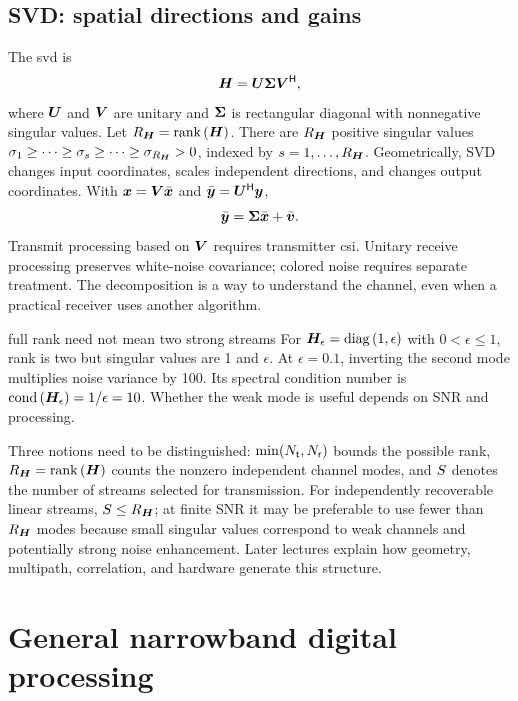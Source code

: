 \subsection{SVD: spatial directions and gains}
The \ac{svd} is
\begin{equation}\label{eq:svd}
\bm{H}=\bm{U}\bm{\Sigma}{\bm{V}}^{\mathsf{H}},
\end{equation}
where $\bm{U}$ and $\bm{V}$ are unitary and $\bm{\Sigma}$ is rectangular diagonal with nonnegative singular values. Let $R_{\bm{H}}=\operatorname{rank}\left(\bm{H}\right)$. There are $R_{\bm{H}}$ positive singular values $\sigma_1\geq\cdots\geq\sigma_s\geq\cdots\geq\sigma_{R_{\bm{H}}}>0$, indexed by $s=1,\ldots,R_{\bm{H}}$. Geometrically, SVD changes input coordinates, scales independent directions, and changes output coordinates. With $\bm{x}=\bm{V}\bar{\bm{x}}$ and $\bar{\bm{y}}={\bm{U}}^{\mathsf{H}}\bm{y}$,
\begin{equation}
\bar{\bm{y}}=\bm{\Sigma}\bar{\bm{x}}+\bar{\bm{v}}.
\end{equation}
Transmit processing based on $\bm{V}$ requires transmitter \ac{csi}. Unitary receive processing preserves white-noise covariance; colored noise requires separate treatment. The decomposition is a way to understand the channel, even when a practical receiver uses another algorithm.

\begin{example}{full rank need not mean two strong streams}
For $\bm{H}_\epsilon=\operatorname{diag}\left(1,\epsilon\right)$ with $0<\epsilon\leq1$, rank is two but singular values are 1 and $\epsilon$. At $\epsilon=0.1$, inverting the second mode multiplies noise variance by 100. Its spectral condition number is $\operatorname{cond}\left(\bm{H}_\epsilon\right)=1/\epsilon=10$. Whether the weak mode is useful depends on SNR and processing.
\end{example}
Three notions need to be distinguished: $\min(N_{\mathsf{t}},N_{\mathsf{r}})$ bounds the possible rank, $R_{\bm{H}}=\operatorname{rank}\left(\bm{H}\right)$ counts the nonzero independent channel modes, and $S$ denotes the number of streams selected for transmission. For independently recoverable linear streams, $S\leq R_{\bm{H}}$; at finite SNR it may be preferable to use fewer than $R_{\bm{H}}$ modes because small singular values correspond to weak channels and potentially strong noise enhancement. Later lectures explain how geometry, multipath, correlation, and hardware generate this structure.

\section{General narrowband digital processing}

